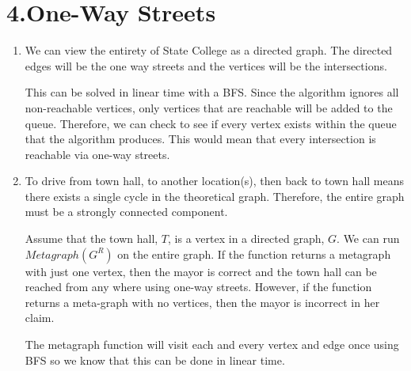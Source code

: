 \documentclass[11pt]{article}
\newenvironment{qparts}{\begin{enumerate}[{(}a{)}]}{\end{enumerate}}
\begin{document}
\section*{4.One-Way Streets}
\begin{qparts}

\item 
We can view the entirety of State College as a directed graph. The directed edges will be the one way streets and the vertices will be the intersections. 

This can be solved in linear time with a BFS. Since the algorithm ignores all non-reachable vertices, only vertices that are reachable will be added to the queue. Therefore, we can check to see if every vertex exists within the queue that the algorithm produces. This would mean that every intersection is reachable via one-way streets. 

\item 
To drive from town hall, to another location(s), then back to town hall means there exists a single cycle in the theoretical graph. Therefore, the entire graph must be a strongly connected component.

Assume that the town hall, $T$, is a vertex in a directed graph, $G$. We can run $Metagraph(G^{R})$ on the entire graph. If the function returns a metagraph with just one vertex, then the mayor is correct and the town hall can be reached from any where using one-way streets. However, if the function returns a meta-graph with no vertices, then the mayor is incorrect in her claim. 

The metagraph function will visit each and every vertex and edge once using BFS so we know that this can be done in linear time. 
\end{qparts}

\newpage
\end{document}
